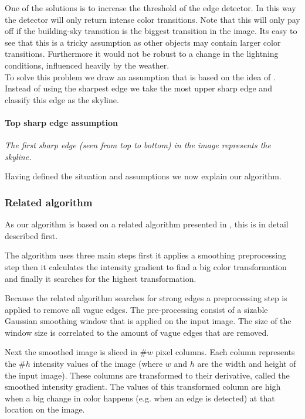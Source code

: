 One of the solutions is to increase the threshold of the edge detector. In this
way the detector will only return intense color transitions. Note that this will
only pay off if the building-sky transition is the biggest transition in the image. 
Its easy to see that this is a tricky assumption as other objects may contain
larger color transitions. Furthermore it would not be robust to a change in
the lightning conditions, influenced heavily by the weather.\\

To solve this problem we draw an assumption that is based on the
idea of \cite{Rover}. Instead of using the sharpest edge we take the most upper sharp
edge and classify this edge as the skyline.\\

\paragraph{Top sharp edge assumption}
\emph{The first sharp edge (seen from top to bottom) in the image 
represents the skyline.}

Having defined the situation and assumptions we now explain our algorithm.

\subsubsection{Related algorithm}
As our algorithm is based on a related algorithm presented in \cite{Rover},
this is in detail described first.

The algorithm uses three main steps first it applies a smoothing preprocessing
step then it calculates the intensity gradient to find a big color transformation
and finally it searches for the highest transformation.

Because the related algorithm searches for strong edges a preprocessing step is
applied to remove all vague edges. The pre-processing consist of a sizable Gaussian
smoothing window that is applied on the input image. The size of the window size
is correlated to the amount of vague edges that are removed.

Next the smoothed image is sliced in \#$w$ pixel columns. Each column represents
the \#$h$ intensity values of the image (where $w$ and $h$ are the width and height of
the input image). 
These columns are transformed to their derivative, called the smoothed intensity gradient. The values
of this transformed column are high when a big change in color happens (e.g.
when an edge is detected) at that location on the image.\\

